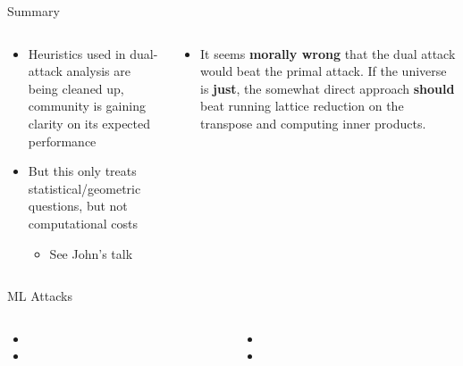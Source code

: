 \documentclass[xcolor=table,10pt,aspectratio=169]{beamer}
\begin{document}
\begin{frame}[label={sec:org5467017}]{Summary}
\begin{columns}[t]
\begin{column}{0.6\columnwidth}
\begin{itemize}
\item Heuristics used in dual-attack analysis are being cleaned up, community is gaining clarity on its expected performance
\item But this only treats statistical/geometric questions, but not computational costs
\begin{itemize}
\item See John's talk
\end{itemize}
\end{itemize}
\end{column}

\begin{column}{0.4\columnwidth}
\begin{itemize}
\item It seems \textbf{morally wrong} that the dual attack would beat the primal attack. If the universe is \textbf{just}, the somewhat direct approach \textbf{should} beat running lattice reduction on the transpose and computing inner products.
\end{itemize}
\end{column}
\end{columns}
\end{frame}

\begin{frame}[label={sec:orgfc3e0a2}]{ML Attacks}
\begin{columns}
\begin{column}[t]{0.5\columnwidth}
{\footnotesize

\begin{itemize}
\item {}
\item {}
\end{itemize}

\par}
\end{column}

\begin{column}[t]{0.5\columnwidth}
{\footnotesize

\begin{itemize}
\item {}
\item {}
\end{itemize}

\par}
\end{column}
\end{columns}
\end{frame}
\end{document}
